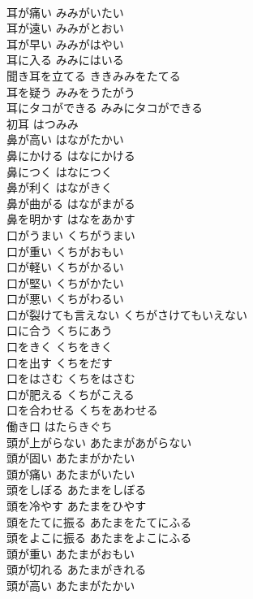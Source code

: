 \documentclass[8pt]{extreport}
\begin{document}
\begin{CJK}{UTF8}{min}
\\	耳が痛い	みみがいたい	
\\	耳が遠い	みみがとおい	
\\	耳が早い	みみがはやい	
\\	耳に入る	みみにはいる	
\\	聞き耳を立てる	ききみみをたてる	
\\	耳を疑う	みみをうたがう	
\\	耳にタコができる	みみにタコができる	
\\	初耳	はつみみ	
\\	鼻が高い	はながたかい	
\\	鼻にかける	はなにかける	
\\	鼻につく	はなにつく	
\\	鼻が利く	はながきく	
\\	鼻が曲がる	はながまがる	
\\	鼻を明かす	はなをあかす	
\\	口がうまい	くちがうまい	
\\	口が重い	くちがおもい	
\\	口が軽い	くちがかるい	
\\	口が堅い	くちがかたい	
\\	口が悪い	くちがわるい	
\\	口が裂けても言えない	くちがさけてもいえない	
\\	口に合う	くちにあう	
\\	口をきく	くちをきく	
\\	口を出す	くちをだす	
\\	口をはさむ	くちをはさむ	
\\	口が肥える	くちがこえる	
\\	口を合わせる	くちをあわせる	
\\	働き口	はたらきぐち	
\\	頭が上がらない	あたまがあがらない	
\\	頭が固い	あたまがかたい	
\\	頭が痛い	あたまがいたい	
\\	頭をしぼる	あたまをしぼる	
\\	頭を冷やす	あたまをひやす	
\\	頭をたてに振る	あたまをたてにふる	
\\	頭をよこに振る	あたまをよこにふる	
\\	頭が重い	あたまがおもい	
\\	頭が切れる	あたまがきれる	
\\	頭が高い	あたまがたかい	

\end{CJK}
\end{document}

